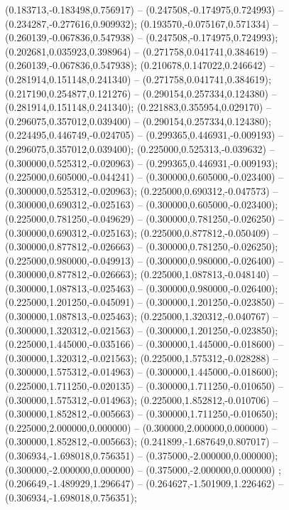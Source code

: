  (0.183713,-0.183498,0.756917) -- (0.247508,-0.174975,0.724993) -- (0.234287,-0.277616,0.909932);
 (0.193570,-0.075167,0.571334) -- (0.260139,-0.067836,0.547938) -- (0.247508,-0.174975,0.724993);
 (0.202681,0.035923,0.398964) -- (0.271758,0.041741,0.384619) -- (0.260139,-0.067836,0.547938);
 (0.210678,0.147022,0.246642) -- (0.281914,0.151148,0.241340) -- (0.271758,0.041741,0.384619);
 (0.217190,0.254877,0.121276) -- (0.290154,0.257334,0.124380) -- (0.281914,0.151148,0.241340);
 (0.221883,0.355954,0.029170) -- (0.296075,0.357012,0.039400) -- (0.290154,0.257334,0.124380);
 (0.224495,0.446749,-0.024705) -- (0.299365,0.446931,-0.009193) -- (0.296075,0.357012,0.039400);
 (0.225000,0.525313,-0.039632) -- (0.300000,0.525312,-0.020963) -- (0.299365,0.446931,-0.009193);
 (0.225000,0.605000,-0.044241) -- (0.300000,0.605000,-0.023400) -- (0.300000,0.525312,-0.020963);
 (0.225000,0.690312,-0.047573) -- (0.300000,0.690312,-0.025163) -- (0.300000,0.605000,-0.023400);
 (0.225000,0.781250,-0.049629) -- (0.300000,0.781250,-0.026250) -- (0.300000,0.690312,-0.025163);
 (0.225000,0.877812,-0.050409) -- (0.300000,0.877812,-0.026663) -- (0.300000,0.781250,-0.026250);
 (0.225000,0.980000,-0.049913) -- (0.300000,0.980000,-0.026400) -- (0.300000,0.877812,-0.026663);
 (0.225000,1.087813,-0.048140) -- (0.300000,1.087813,-0.025463) -- (0.300000,0.980000,-0.026400);
 (0.225000,1.201250,-0.045091) -- (0.300000,1.201250,-0.023850) -- (0.300000,1.087813,-0.025463);
 (0.225000,1.320312,-0.040767) -- (0.300000,1.320312,-0.021563) -- (0.300000,1.201250,-0.023850);
 (0.225000,1.445000,-0.035166) -- (0.300000,1.445000,-0.018600) -- (0.300000,1.320312,-0.021563);
 (0.225000,1.575312,-0.028288) -- (0.300000,1.575312,-0.014963) -- (0.300000,1.445000,-0.018600);
 (0.225000,1.711250,-0.020135) -- (0.300000,1.711250,-0.010650) -- (0.300000,1.575312,-0.014963);
 (0.225000,1.852812,-0.010706) -- (0.300000,1.852812,-0.005663) -- (0.300000,1.711250,-0.010650);
 (0.225000,2.000000,0.000000) -- (0.300000,2.000000,0.000000) -- (0.300000,1.852812,-0.005663);
 (0.241899,-1.687649,0.807017) -- (0.306934,-1.698018,0.756351) -- (0.375000,-2.000000,0.000000);
 (0.300000,-2.000000,0.000000) -- (0.375000,-2.000000,0.000000) ;
 (0.206649,-1.489929,1.296647) -- (0.264627,-1.501909,1.226462) -- (0.306934,-1.698018,0.756351);
